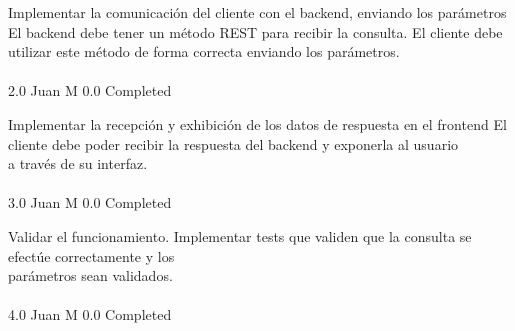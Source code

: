 		{Implementar la comunicación del cliente con el backend, enviando los parámetros} %
		{El backend debe tener un método REST para recibir la consulta. El cliente debe\\
utilizar este método de forma correcta enviando los parámetros.\\
\\
} %
		{2.0} %
		{Juan M} %
		{0.0} %
		{Completed} %

		{Implementar la recepción y exhibición de los datos de respuesta en el frontend} %
		{El cliente debe poder recibir la respuesta del backend y exponerla al usuario\\
a través de su interfaz.\\
\\
} %
		{3.0} %
		{Juan M} %
		{0.0} %
		{Completed} %

		{Validar el funcionamiento.} %
		{Implementar tests que validen que la consulta se efectúe correctamente y los\\
parámetros sean validados.\\
\\
} %
		{4.0} %
		{Juan M} %
		{0.0} %
		{Completed} %


\vspace{20pt}

